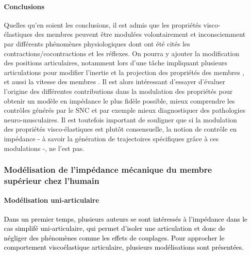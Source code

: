 \paragraph{Conclusions}

Quelles qu'en soient les conclusions, il est admis que les propriétés visco-élastiques des membres peuvent être modulées volontairement et inconsciemment par différents phénomènes physiologiques dont ont été cités les contractions/cocontractions et les réflexes. On pourra y ajouter la modification des positions articulaires, notamment lors d'une tâche impliquant plusieurs articulations pour modifier l'inertie et la projection des propriétés des membres \parencite{mussa-ivaldi_neural_1985, hogan_mechanics_1985, trumbower_use_2009}, et aussi la vitesse des membres \parencite{kuxhaus_dependence_2014}. Il est alors intéressant d'essayer d'évaluer l'origine des différentes contributions dans la modulation des propriétés \parencite{bennett_catching_1994, kearney_identification_1997, ludvig_identification_2011, kuxhaus_dependence_2014, guarin_unbiased_2018} pour obtenir un modèle en impédance le plus fidèle possible, mieux comprendre les contrôles générés par le SNC et par exemple mieux diagnostiquer des pathologies neuro-musculaires. Il est toutefois important de souligner que si la modulation des propriétés visco-élastiques est plutôt consensuelle, la notion de contrôle en impédance - à savoir la génération de trajectoires spécifiques grâce à ces modulations -, ne l'est pas.

\subsubsection{Modélisation de l'impédance mécanique du membre supérieur chez l'humain}

\paragraph{Modélisation uni-articulaire}

\textcolor{black}{Dans un premier temps, plusieurs auteurs se sont intéressés à l'impédance dans le cas simplifé uni-articulaire, qui permet d'isoler une articulation et donc de négliger des phénomènes comme les effets de couplages. Pour approcher le comportement viscoélastique articulaire, plusieurs modélisations sont présentées.}

